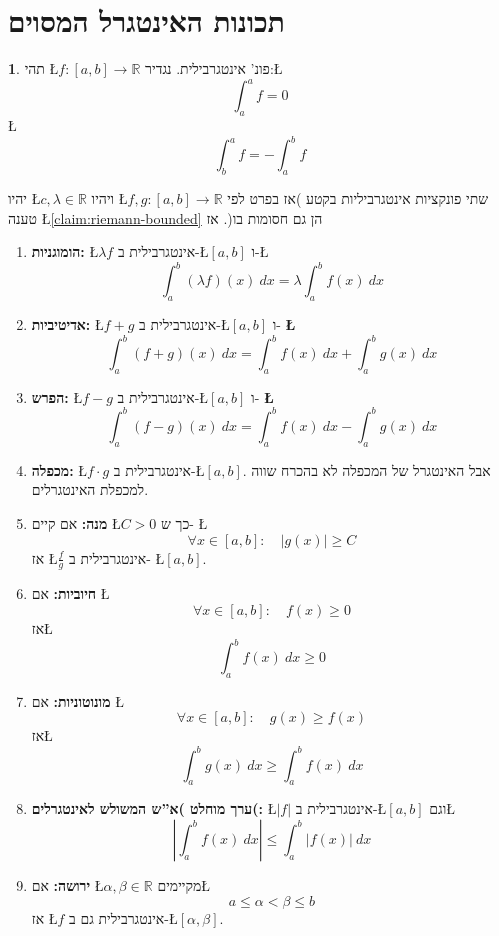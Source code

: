 \documentclass[english,hebrew]{article}
\theoremstyle{remark}
\theoremstyle{definition}
\newtheorem*{defn*}{\protect\definitionname}
\theoremstyle{plain}
\theoremstyle{remark}
\theoremstyle{plain}
\theoremstyle{plain}
\providecommand{\definitionname}{הגדרה}
\begin{document}
\part{תכונות האינטגרל המסוים}
\begin{defn*}
תהי \L{$f:\left[a,b\right]\rightarrow\mathbb{R}$} פונ' אינטגרבילית.
נגדיר:\L{%
\[
\int_{a}^{a}f=0
\]
}%
\L{%
\[
\int_{b}^{a}f=-\int_{a}^{b}f
\]
}%
\end{defn*}
יהיו \L{$c,\lambda\in\mathbb{R}$} ויהיו \L{$f,g:\left[a,b\right]\rightarrow\mathbb{R}$}
שתי פונקציות אינטגרביליות בקטע )אז בפרט לפי טענה \L{\ref{claim:riemann-bounded}}
הן גם חסומות בו(. אז
\begin{enumerate}
\item \textbf{הומוגניות: }\L{$\lambda f$} אינטגרבילית ב-\L{$\left[a,b\right]$}
ו-\L{%
\[
\int_{a}^{b}\left(\lambda f\right)\left(x\right)\ dx=\lambda\int_{a}^{b}f\left(x\right)\ dx
\]
}%
\item \textbf{אדיטיביות: }\L{$f+g$} אינטגרבילית ב-\L{$\left[a,b\right]$}
ו-\textbf{ \L{%
\[
\int_{a}^{b}\left(f+g\right)\left(x\right)\ dx=\int_{a}^{b}f\left(x\right)\ dx+\int_{a}^{b}g\left(x\right)\ dx
\]
}%
}
\item \textbf{הפרש: }\L{$f-g$} אינטגרבילית ב-\L{$\left[a,b\right]$} ו-\textbf{
\L{%
\[
\int_{a}^{b}\left(f-g\right)\left(x\right)\ dx=\int_{a}^{b}f\left(x\right)\ dx-\int_{a}^{b}g\left(x\right)\ dx
\]
}%
}
\item \textbf{מכפלה: }\L{$f\cdot g$} אינטגרבילית ב-\L{$\left[a,b\right]$}.
אבל האינטגרל של המכפלה לא בהכרח שווה למכפלת האינטגרלים.
\item \textbf{מנה: }אם קיים \L{$C>0$} כך ש- \L{%
\[
\forall x\in\left[a,b\right]:\quad\left|g(x)\right|\ge C
\]
}%
אז \L{$\frac{f}{g}$} אינטגרבילית ב- \L{$\left[a,b\right]$}.
\item \textbf{חיוביות: }אם \L{%
\[
\forall x\in\left[a,b\right]:\quad f(x)\ge0
\]
}%
אז\L{%
\[
\int_{a}^{b}f\left(x\right)\ dx\ge0
\]
}%
\item \textbf{מונוטוניות:} אם \L{%
\[
\forall x\in\left[a,b\right]:\quad g(x)\ge f(x)
\]
}%
 אז\L{%
\[
\int_{a}^{b}g\left(x\right)\ dx\ge\int_{a}^{b}f\left(x\right)\ dx
\]
}%
\item \textbf{ערך מוחלט )א\textquotedblright ש המשולש לאינטגרלים(:} \L{$\left|f\right|$}
אינטגרבילית ב-\L{$\left[a,b\right]$} וגם\L{%
\[
\left|\int_{a}^{b}f\left(x\right)\ dx\right|\le\int_{a}^{b}\left|f(x)\right|\ dx
\]
}%
\item \textbf{ירושה: }אם \L{$\alpha,\beta\in\mathbb{R}$} מקיימים\L{%
\[
a\le\alpha<\beta\le b
\]
}%
אז \L{$f$} אינטגרבילית גם ב-\L{$\left[\alpha,\beta\right]$}.

\end{enumerate}
\end{document}
